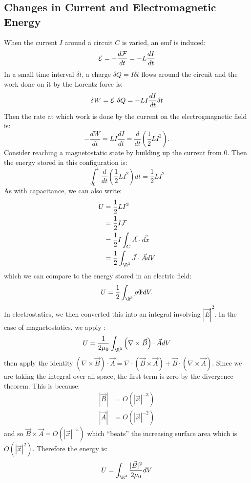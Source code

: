 \documentclass[../Main.tex]{subfiles}
\begin{document}
\subsection{Changes in Current and Electromagnetic Energy}
When the current $I$ around a circuit $C$ is varied, an emf is induced:
\begin{equation*}
    \mathcal{E} = -\frac{d\mathcal{F}}{dt} = -L \frac{dI}{dt}
\end{equation*}
In a small time interval $\delta t$, a charge $\delta Q = I \delta t$ flows around the circuit and the work done on it by the Lorentz force is:
\begin{equation*}
    \delta W = \mathcal{E}~\delta Q = -LI \frac{dI}{dt} \delta t
\end{equation*}
Then the rate at which work is done by the current on the electrogmagnetic field is:
\begin{equation*}
    -\frac{dW}{dt} = LI \frac{dI}{dt} = \frac{d}{dt} \left(\frac12 LI^2\right).
\end{equation*}
Consider reaching a magnetostatic state by building up the current from 0. Then the energy stored in this configuration is:
\begin{equation*}
    \int_0^t \frac{d}{dt} \left(\frac12 LI^2\right) dt = \frac12 LI^2
\end{equation*}
As with capacitance, we can also write:
\begin{align*}
    U &= \frac12 LI^2 \\
    &= \frac12 I \flux \\
    &= \frac12 I \int_C \vec{A} \cdot \vec{dx} \\
    &= \frac12 \int_{\R^3} \vec{J} \cdot \vec{A} dV
\end{align*}
which we can compare to the energy stored in an electric field:
\begin{equation*}
    U = \frac12 \int_{\R^3} \rho \Phi dV.
\end{equation*}
In electrostatics, we then converted this into an integral involving $|\vec{E}|^2$. In the case of magnetostatics, we apply :
\begin{equation*}
    U = \frac{1}{2\mu_0} \int_{\R^3} \left(\nabla \times \vec{B}\right)\cdot \vec{A} dV
\end{equation*}
then apply the identity $(\nabla \times \vec{B}) \cdot \vec{A} = \nabla \cdot (\vec{B} \times \vec{A}) + \vec{B} \cdot (\nabla \times \vec{A})$. Since we are taking the integral over all space, the first term is zero by the divergence theorem. This is because:
\begin{align*}
    |\vec{B}| &= O(|\vec{x}|^{-3}) \\
    |\vec{A}| &= O(|\vec{x}|^{-2})
\end{align*}
and so $\vec{B} \times \vec{A} = O(|\vec{x}|^{-5})$ which ``beats'' the increasing surface area which is $O(|\vec{x}|^2)$. Therefore the energy is:
\begin{equation*}
    U = \int_{\R^3} \frac{|\vec{B}|^2}{2\mu_0} dV
\end{equation*}
\end{document}
